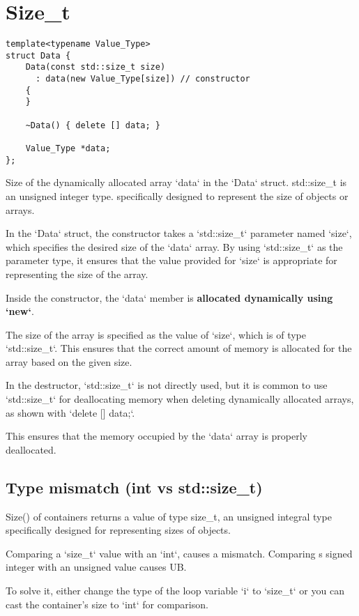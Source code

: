 \section{Size\_t}

\begin{verbatim}
template<typename Value_Type>
struct Data {
    Data(const std::size_t size)
      : data(new Value_Type[size]) // constructor
    {
    }

    ~Data() { delete [] data; }

    Value_Type *data;
};
\end{verbatim}

Size of the dynamically allocated array `data` in the `Data` struct. 
std::size\_t is an unsigned integer type.
specifically designed to represent the size of objects or arrays. 

In the `Data` struct, the constructor takes a `std::size\_t` parameter named `size`,
which specifies the desired size of the `data` array. 
By using `std::size\_t` as the parameter type, 
it ensures that the value provided for `size` is appropriate for representing the size of the array.

Inside the constructor, the `data` member is \textbf{allocated dynamically using `new`}.

The size of the array is specified as the value of `size`, which is of type `std::size\_t`. 
This ensures that the correct amount of memory is allocated for the array based on the given size.

In the destructor, `std::size\_t` is not directly used, but it is common to use `std::size\_t`
for deallocating memory when deleting dynamically allocated arrays, as shown with `delete [] data;`.

This ensures that the memory occupied by the `data` array is properly deallocated.

\subsection{Type mismatch (int vs std::size\_t)}

Size() of containers returns a value of type size\_t, 
an unsigned integral type specifically designed for representing sizes of objects.

Comparing a `size\_t` value with an `int`, causes a mismatch.
Comparing s signed integer with an unsigned value causes UB.

To solve it, either change the type of the loop variable `i` to `size\_t`
or you can cast the container's size to `int` for comparison.

